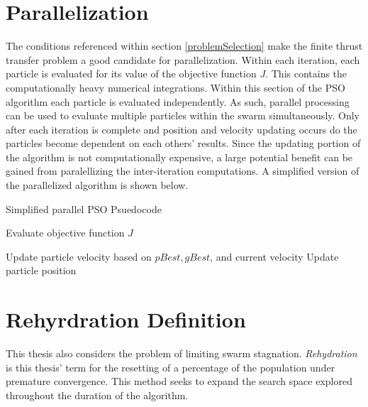 \section{Parallelization}

\noindent The conditions referenced within section \ref{problemSelection} make the finite thrust transfer problem a good candidate for parallelization.
Within each iteration, each particle is evaluated for its value of the objective function $J$. This  contains the computationally heavy numerical integrations. Within this section of the PSO algorithm each particle is evaluated independently. 
As such, parallel processing can be used to evaluate multiple particles within the swarm simultaneously. Only after each iteration is complete and position and velocity updating occurs do the particles become dependent on each others' results. Since 
the updating portion of the algorithm is not computationally expensive, a large potential benefit can be gained from paralellizing the inter-iteration computations. A simplified version of the parallelized algorithm is shown below.

\begin{algorithm}[H]
    \caption{Simplified parallel PSO Psuedocode}
    \begin{algorithmic}
    \STATE Evaluate objective function $J$
    \hspace{17em}

    \ENDFOR
    \STATE Update particle velocity based on $pBest, gBest$, and current velocity
    \STATE Update particle position
    \ENDFOR
    \end{algorithmic}
    \label{alg:PPSOpsuedocode}
\end{algorithm}


\section{Rehyrdration Definition}

\noindent This thesis also considers the problem of limiting swarm stagnation.
\textit{Rehydration} is this thesis' term for the resetting of a percentage of the population under premature convergence.
This method seeks to expand the search space explored throughout the duration of the algorithm. \newline

